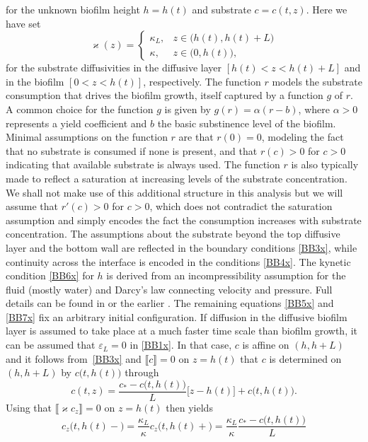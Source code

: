 \documentclass[reqno,11pt]{amsart}
\numberwithin{equation}{section}
\begin{document}
for the unknown biofilm height $h=h(t)$ and substrate $c=c(t,z)$. Here
we have set
$$\varkappa(z)=\begin{cases}
  \kappa_L,&z\in \bigl( h(t),h(t)+L\bigr)\\
  \kappa,&z\in \bigl(0,h(t)\bigr),
\end{cases}
$$
for the substrate diffusivities in the diffusive layer
$[h(t)<z<h(t)+L]$ and in the biofilm $[0<z<h(t)]$, respectively. The
function $r$ models the substrate consumption that drives the biofilm
growth, itself captured by a function $g$ of $r$. A common choice for
the function $g$ is given by $g(r)=\alpha(r-b)$, where $\alpha>0$
represents a yield coefficient and $b$ the basic substinence level of
the biofilm. Minimal assumptions on the function $r$ are that
$r(0)=0$, modeling the fact that no substrate is consumed if none is
present, and that $r(c)>0$ for $c>0$ indicating that available
substrate is always used. The function $r$ is also typically made to reflect a
saturation at increasing levels of the substrate concentration. We
shall not make use of this additional structure in this analysis but
we will assume that $r'(c)>0$ for $c>0$, which does not contradict the
saturation assumption and simply encodes the fact the consumption
increases with substrate concentration. The assumptions about the
substrate beyond the top diffusive layer and the bottom wall are
reflected in the boundary conditions  \eqref{BB3x}, while continuity
across the interface is encoded in the conditions \eqref{BB4x}.
The kynetic condition \eqref{BB6x} for $h$ is derived from an
incompressibility assumption for the fluid (mostly 
water) and Darcy's law connecting velocity and pressure. Full details
can be found in \cite{KD10} or the earlier \cite{KD02}. The remaining
equations \eqref{BB5x} and \eqref{BB7x} fix an arbitrary initial
configuration. 
If diffusion in the diffusive biofilm layer is assumed to take place
at a much faster time scale than biofilm growth, it can be assumed
that $\varepsilon_L=0$ in \eqref{BB1x}. In that case, $c$ is affine on
$(h,h+L)$ and it follows from~\eqref{BB3x} and $\llbracket c\rrbracket=0$ on $z=h(t)$ that
$c$ is determined on $(h,h+L)$ by $c\bigl(t,h(t)\bigr)$ through
\begin{equation}\label{e0x}
c(t,z)=\frac{c_*-c\bigl(t,h(t)\bigr)}{L}\big[z-h(t)\big]+c\bigl(t,h(t)\bigr).
\end{equation}
Using that $\llbracket \varkappa c_z\rrbracket=0$  on  $z=h(t)$ then yields
$$
c_z\bigl(t,h(t)-\bigr)=\frac{\kappa_L}{\kappa}c_z\bigl(t,h(t)+\bigr)=
\frac{\kappa_L}{\kappa}\frac{c_*-c\bigl(t,h(t)\bigr)}{L}
$$
\end{document}
